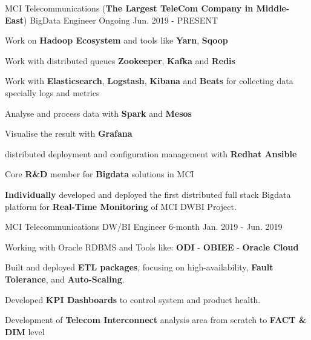 

\begin{cventries}

  \cventry
    {MCI Telecommunications (\textbf{The Largest TeleCom Company in Middle-East})} %
    {BigData Engineer} %
    {Ongoing} %
    {Jun. 2019 - PRESENT} %
    {
      \begin{cvitems} %
        \item {Work on \textbf{Hadoop Ecosystem} and tools like \textbf{Yarn}, \textbf{Sqoop}}
        \item {Work with distributed queues \textbf{Zookeeper}, \textbf{Kafka} and \textbf{Redis}}
        \item {Work with \textbf{Elasticsearch}, \textbf{Logstash}, \textbf{Kibana} and \textbf{Beats} for collecting data specially logs and metrics}
        \item {Analyse and process data with \textbf{Spark} and \textbf{Mesos}}
        \item {Visualise the result with \textbf{Grafana}}
        \item {distributed deployment and configuration management with \textbf{Redhat Ansible}}
        \item {Core \textbf{R\&D} member for \textbf{Bigdata} solutions in MCI}
        \item {\textbf{Individually} developed and deployed the first distributed full stack Bigdata platform for \textbf{Real-Time Monitoring} of MCI DWBI Project.}
      \end{cvitems}
    }
    
  \cventry
    {MCI Telecommunications} %
    {DW/BI Engineer} %
    {6-month} %
    {Jan. 2019 - Jun. 2019} %
    {
      \begin{cvitems} %
        \item {Working with Oracle RDBMS and Tools like: \textbf{ODI} - \textbf{OBIEE} - \textbf{Oracle Cloud}}
        \item {Built and deployed \textbf{ETL packages}, focusing on high-availability, \textbf{Fault Tolerance}, and \textbf{Auto-Scaling}.}
        \item {Developed \textbf{KPI Dashboards} to control system and product health.}
        \item {Development of \textbf{Telecom Interconnect} analysis area from scratch to \textbf{FACT \& DIM} level}
      \end{cvitems}
    }
    

\end{cventries}
